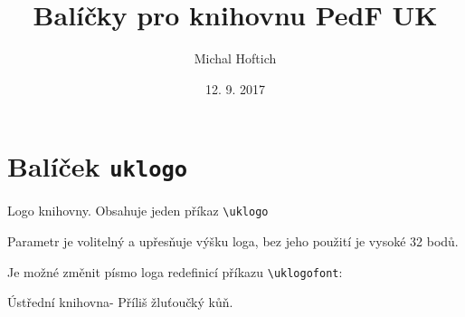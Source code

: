 \documentclass{article}
\begin{document}
\title{Balíčky pro knihovnu PedF UK}
\author{Michal Hoftich}
\date{12. 9. 2017}
\maketitle

\section{Balíček \texttt{uklogo}}

Logo knihovny. Obsahuje jeden příkaz \verb|\uklogo|

\begin{LTXexample}
  \uklogo
  \uklogo[24pt]
\end{LTXexample}

Parametr je volitelný a upřesňuje výšku loga, bez jeho použití je vysoké 32 bodů.

Je možné změnit písmo loga redefinicí příkazu \verb|\uklogofont|:

\begin{LTXexample}
  \newfontfamily{}
  \uklogo
\end{LTXexample}


Ústřední knihovna- Příliš žluťoučký kůň.
\end{document}
